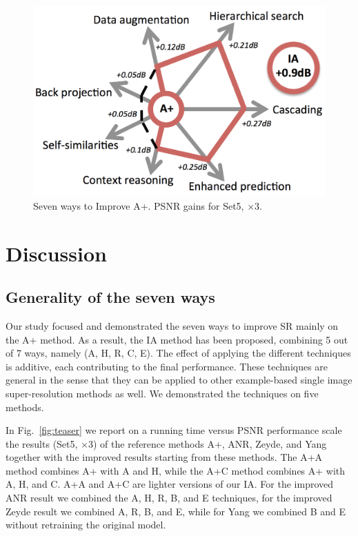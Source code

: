 \documentclass[10pt,twocolumn,letterpaper]{article}
\begin{document}
\begin{figure}
\centering
\includegraphics[width=0.9\linewidth]{overview_aplus_impr.png}
\caption{Seven ways to Improve A+. PSNR gains for Set5, $\times3$.}
\label{fig:seven}
\vspace{-0.25cm}
\end{figure}

\section{Discussion}
\label{sec:discussion}

\subsection{Generality of the seven ways}
\label{ssc:generality}
Our study focused and demonstrated the seven ways to improve SR mainly on the A+ method.
As a result, the IA method has been proposed, combining 5 out of 7 ways, namely (A, H, R, C, E).
The effect of applying the different techniques is additive, each contributing to the final performance.
These techniques are general in the sense that they can be applied to other example-based single image super-resolution methods as well. We demonstrated the techniques on five methods.

In Fig.~\ref{fig:teaser} we report on a running time versus PSNR performance scale the results (Set5, $\times3$) of the reference methods A+, ANR, Zeyde, and Yang together with the improved results starting from these methods.
The A+A method combines A+ with A and H, while the A+C method combines A+ with A, H, and C. A+A and A+C are lighter versions of our IA.
For the improved ANR result we combined the A, H, R, B, and E techniques, for the improved Zeyde result we combined A, R, B, and E, while for Yang we combined B and E without retraining the original model.
\end{document}
